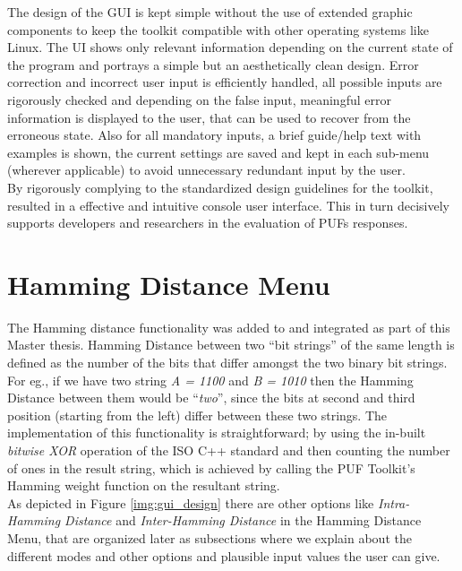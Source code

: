 The design of the GUI is kept simple without the use of extended graphic components to keep the toolkit compatible with other operating systems like Linux. The UI shows only relevant information depending on the current state of the program and portrays a simple but an aesthetically clean design. Error correction and incorrect user input is efficiently handled, all possible inputs are rigorously checked and depending on the false input, meaningful error information is displayed to the user, that can be used to
recover from the erroneous state. Also for all mandatory inputs, a brief guide/help text with examples is shown, the current settings are saved and kept in each sub-menu (wherever applicable) to avoid unnecessary redundant input by the user.\\

By rigorously complying to the standardized design guidelines for the toolkit, resulted in a effective and intuitive console user interface.
This in turn decisively supports developers and researchers in the evaluation of PUFs responses.\cite{71}


\section{Hamming Distance Menu}
\label{Hamming_Distance_menu}
The Hamming distance functionality was added to and integrated as part of this Master thesis. Hamming Distance between two ``bit strings'' of the same length is defined as the number of the bits that differ amongst the two binary bit strings. For eg., if we have two string \emph{A = 1100} and \emph{B = 1010} then the Hamming Distance between them would be ``\emph{two}'', since the bits at second and third position (starting from the left) differ between these two strings. The implementation of
this functionality is straightforward; by using the in-built \emph{bitwise XOR} operation of the ISO C++ standard and then counting the number of ones in the result string, which is achieved by calling the PUF Toolkit's Hamming weight function on the resultant string.\\

As depicted in Figure \ref{img:gui_design} there are other options like \emph{Intra-Hamming Distance} and \emph{Inter-Hamming Distance} in the Hamming Distance Menu, that are organized later as subsections where we explain about the different modes and other options and plausible input values the user can give.\\

